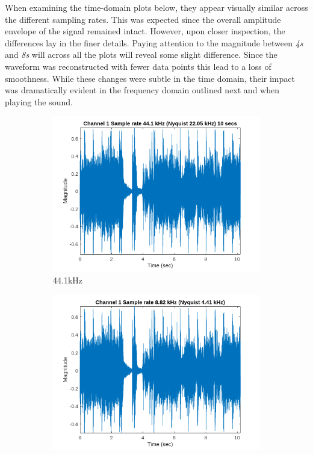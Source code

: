 \documentclass[12pt]{article}
\begin{document}
When examining the time-domain plots below, they appear visually similar across the different sampling rates. This was expected since the overall amplitude envelope of the signal remained intact. However, upon closer inspection, the differences lay in the finer details. Paying attention to the magnitude between \textit{4s} and \textit{8s} will across all the plots will reveal some slight difference. Since the waveform was reconstructed with fewer data points this lead to a loss of smoothness. While these changes were subtle in the time domain, their impact was dramatically evident in the frequency domain outlined next and when playing the sound.
\begin{figure}[htbp]
  \centering
  \begin{subfigure}[b]{0.48\textwidth} %
    \includegraphics[width=\linewidth]{labs/lab1/lab-report-tex/figures/figure_1.png}
    \caption{44.1kHz}
    \label{fig:f2}
  \end{subfigure}
  \begin{subfigure}[b]{0.48\textwidth} %
    \includegraphics[width=\linewidth]{labs/lab1/lab-report-tex/figures/figure_2.png}

\end{subfigure}
\end{figure}
\end{document}
